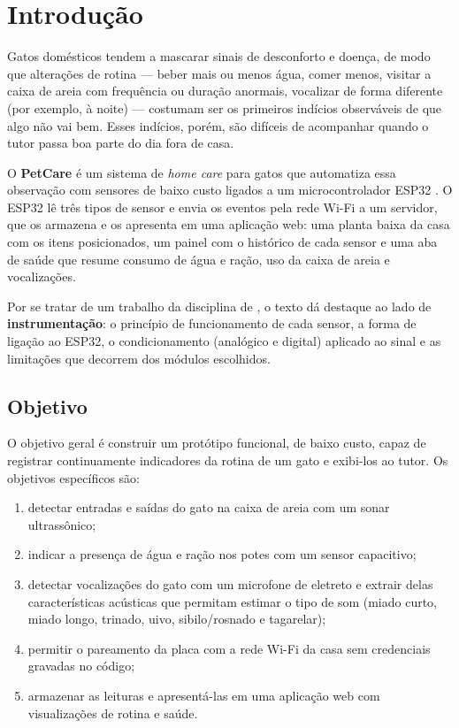 \section{Introdução}
\label{sec:intro}

Gatos domésticos tendem a mascarar sinais de desconforto e doença, de modo que alterações de rotina --- beber mais ou menos água, comer menos, visitar a caixa de areia com frequência ou duração anormais, vocalizar de forma diferente (por exemplo, à noite) --- costumam ser os primeiros indícios observáveis de que algo não vai bem. Esses indícios, porém, são difíceis de acompanhar quando o tutor passa boa parte do dia fora de casa. 

O \textbf{PetCare} é um sistema de \textit{home care} para gatos que automatiza essa observação com sensores de baixo custo ligados a um microcontrolador ESP32 \citep{esp32datasheet}. O ESP32 lê três tipos de sensor e envia os eventos pela rede Wi-Fi a um servidor, que os armazena e os apresenta em uma aplicação web: uma planta baixa da casa com os itens posicionados, um painel com o histórico de cada sensor e uma aba de saúde que resume consumo de água e ração, uso da caixa de areia e vocalizações.

Por se tratar de um trabalho da disciplina de , o texto dá destaque ao lado de \textbf{instrumentação}: o princípio de funcionamento de cada sensor, a forma de ligação ao ESP32, o condicionamento (analógico e digital) aplicado ao sinal e as limitações que decorrem dos módulos escolhidos.

\subsection{Objetivo}

O objetivo geral é construir um protótipo funcional, de baixo custo, capaz de registrar continuamente indicadores da rotina de um gato e exibi-los ao tutor. Os objetivos específicos são:
\begin{enumerate}
  \item detectar entradas e saídas do gato na caixa de areia com um sonar ultrassônico;
  \item indicar a presença de água e ração nos potes com um sensor capacitivo;
  \item detectar vocalizações do gato com um microfone de eletreto e extrair delas características acústicas que permitam estimar o tipo de som (miado curto, miado longo, trinado, uivo, sibilo/rosnado e tagarelar);
  \item permitir o pareamento da placa com a rede Wi-Fi da casa sem credenciais gravadas no código;
  \item armazenar as leituras e apresentá-las em uma aplicação web com visualizações de rotina e saúde.
\end{enumerate}

